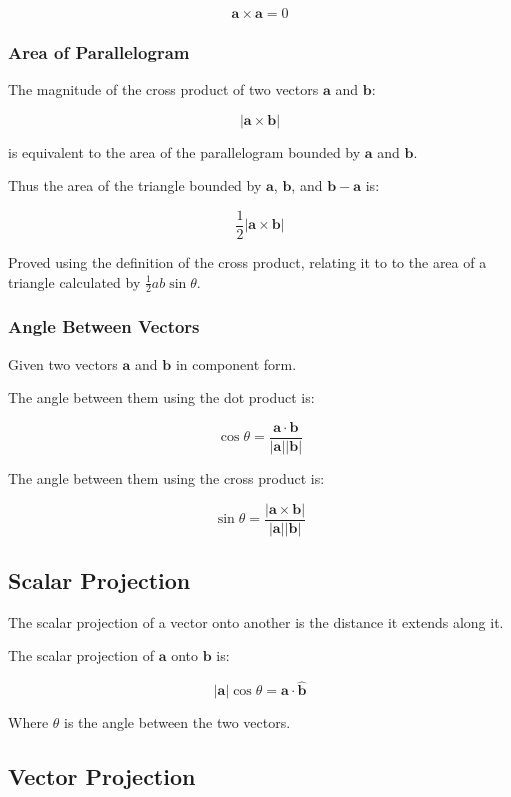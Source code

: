 \documentclass[a4paper,11pt]{report}
\newcommand{\bb}{\boldsymbol}
\begin{document}
$$
\bb{a} \times \bb{a} = 0
$$

\subsubsection{Area of Parallelogram}

The magnitude of the cross product of two vectors $\bb{a}$ and $\bb{b}$:

$$
\lvert \bb{a} \times \bb{b} \rvert
$$

is equivalent to the area of the parallelogram bounded by $\bb{a}$ and $\bb{b}$.

Thus the area of the triangle bounded by $\bb{a}$, $\bb{b}$, and
$\bb{b} - \bb{a}$ is:

$$
\frac{1}{2} \lvert \bb{a} \times \bb{b} \rvert
$$

Proved using the definition of the cross product, relating it to to the area of
a triangle calculated by $\frac{1}{2} a b \sin{\theta}$.

\subsubsection{Angle Between Vectors}

Given two vectors $\bb{a}$ and $\bb{b}$ in component form.

The angle between them using the dot product is:

$$
\cos{\theta} = \frac{\bb{a} \cdot \bb{b}}{\lvert \bb{a} \rvert \lvert \bb{b} \rvert}
$$

The angle between them using the cross product is:

$$
\sin{\theta} = \frac{\lvert \bb{a} \times \bb{b} \rvert}{\lvert \bb{a} \rvert \lvert \bb{b} \rvert}
$$

\subsection{Scalar Projection}

The scalar projection of a vector onto another is the distance it extends along
it.

The scalar projection of $\bb{a}$ onto $\bb{b}$ is:

$$
\lvert \bb{a} \rvert \cos{\theta} = \bb{a} \cdot \hat{\bb{b}}
$$

Where $\theta$ is the angle between the two vectors.

\subsection{Vector Projection}
\end{document}
